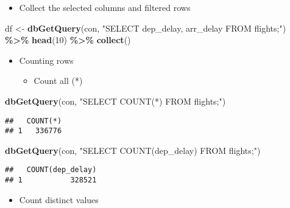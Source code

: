 \documentclass[
]{book}
\newenvironment{Shaded}{\begin{snugshade}}{\end{snugshade}}
\newcommand{\DecValTok}[1]{\textcolor[rgb]{0.00,0.00,0.81}{#1}}
\newcommand{\KeywordTok}[1]{\textcolor[rgb]{0.13,0.29,0.53}{\textbf{#1}}}
\newcommand{\NormalTok}[1]{#1}
\newcommand{\OperatorTok}[1]{\textcolor[rgb]{0.81,0.36,0.00}{\textbf{#1}}}
\newcommand{\StringTok}[1]{\textcolor[rgb]{0.31,0.60,0.02}{#1}}
\providecommand{\tightlist}{%
  \setlength{\itemsep}{0pt}\setlength{\parskip}{0pt}}
\begin{document}
\begin{itemize}
\tightlist
\item
  Collect the selected columns and filtered rows
\end{itemize}

\begin{Shaded}
\begin{Highlighting}[]
\NormalTok{df \textless{}{-}}\StringTok{ }\KeywordTok{dbGetQuery}\NormalTok{(con, }
  \StringTok{"SELECT dep\_delay, arr\_delay FROM flights;"}\NormalTok{) }\OperatorTok{\%\textgreater{}\%}
\StringTok{  }\KeywordTok{head}\NormalTok{(}\DecValTok{10}\NormalTok{) }\OperatorTok{\%\textgreater{}\%}
\StringTok{  }\KeywordTok{collect}\NormalTok{()}
\end{Highlighting}
\end{Shaded}

\begin{itemize}
\item
  Counting rows

  \begin{itemize}
  \tightlist
  \item
    Count all (*)
  \end{itemize}
\end{itemize}

\begin{Shaded}
\begin{Highlighting}[]
\KeywordTok{dbGetQuery}\NormalTok{(con, }
          \StringTok{"SELECT COUNT(*) }
\StringTok{           FROM flights;"}\NormalTok{) }
\end{Highlighting}
\end{Shaded}

\begin{verbatim}
##   COUNT(*)
## 1   336776
\end{verbatim}

\begin{Shaded}
\begin{Highlighting}[]
\KeywordTok{dbGetQuery}\NormalTok{(con, }
           \StringTok{"SELECT COUNT(dep\_delay)}
\StringTok{           FROM flights;"}\NormalTok{)}
\end{Highlighting}
\end{Shaded}

\begin{verbatim}
##   COUNT(dep_delay)
## 1           328521
\end{verbatim}

\begin{itemize}
\tightlist
\item
  Count distinct values
\end{itemize}
\end{document}
